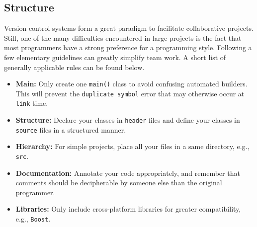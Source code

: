 \documentclass[11pt]{article}
\begin{document}
\subsection*{Structure}

Version control systems form a great paradigm to facilitate collaborative projects.
Still, one of the many difficulties encountered in large projects is the fact that most programmers have a strong preference for a programming style.
Following a few elementary guidelines can greatly simplify team work.
A short list of generally applicable rules can be found below.
\begin{itemize}
\item \textbf{Main:} Only create one \texttt{main()} class to avoid confusing automated builders.
This will prevent the \texttt{duplicate symbol} error that may otherwise occur at \texttt{link} time.
\item \textbf{Structure:} Declare your classes in \texttt{header} files and define your classes in \texttt{source} files in a structured manner.
\item \textbf{Hierarchy:} For simple projects, place all your files in a same directory, e.g., \texttt{src}.
\item \textbf{Documentation:} Annotate your code appropriately, and remember that comments should be decipherable by someone else than the original programmer.
\item \textbf{Libraries:} Only include cross-platform libraries for greater compatibility, e.g., \texttt{Boost}.
\end{itemize}
\end{document}
